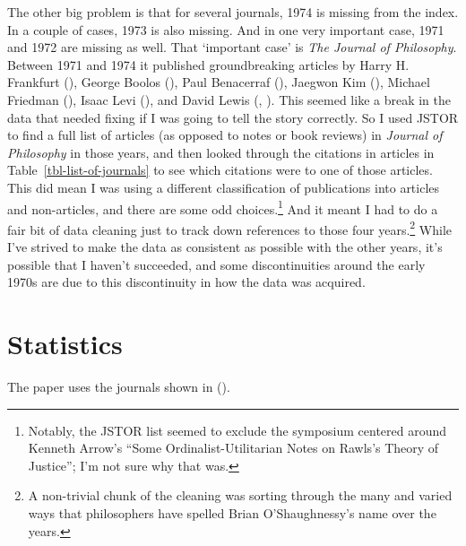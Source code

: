 \documentclass[
  12pt,
  letterpaper,
  DIV=11,
  numbers=noendperiod]{scrartcl}
\begin{document}
The other big problem is that for several journals, 1974 is missing from
the index. In a couple of cases, 1973 is also missing. And in one very
important case, 1971 and 1972 are missing as well. That `important case'
is \emph{The Journal of Philosophy}. Between 1971 and 1974 it published
groundbreaking articles by Harry H. Frankfurt
(), George Boolos
(), Paul Benacerraf
(), Jaegwon Kim
(), Michael Friedman
(), Isaac Levi
(), and David Lewis
(, ).
This seemed like a break in the data that needed fixing if I was going
to tell the story correctly. So I used JSTOR to find a full list of
articles (as opposed to notes or book reviews) in \emph{Journal of
Philosophy} in those years, and then looked through the citations in
articles in Table~\ref{tbl-list-of-journals} to see which citations were
to one of those articles. This did mean I was using a different
classification of publications into articles and non-articles, and there
are some odd choices.\footnote{Notably, the JSTOR list seemed to exclude
  the symposium centered around Kenneth Arrow's ``Some
  Ordinalist-Utilitarian Notes on Rawls's Theory of Justice''; I'm not
  sure why that was.} And it meant I had to do a fair bit of data
cleaning just to track down references to those four years.\footnote{A
  non-trivial chunk of the cleaning was sorting through the many and
  varied ways that philosophers have spelled Brian O'Shaughnessy's name
  over the years.} While I've strived to make the data as consistent as
possible with the other years, it's possible that I haven't succeeded,
and some discontinuities around the early 1970s are due to this
discontinuity in how the data was acquired.

\section{Statistics}\label{sec-statistics}

The paper uses the journals shown in
().
\end{document}

